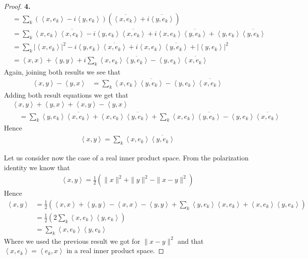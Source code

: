 \documentclass[11pt]{article}
\newcommand{\inprd}[1]{\left\langle{#1}\right\rangle}
\theoremstyle{definition}
\begin{document}
\begin{proof}{\textbf{4.}}
\begin{align*}
    &= \sum_{k} (\inprd{x, e_k}-i\inprd{y, e_k})(\overline{\inprd{x, e_k}}
    + i\overline{\inprd{y,e_k}})\\
    &= \sum_{k} \inprd{x, e_k}\overline{\inprd{x, e_k}}
    - i\inprd{y, e_k}\overline{\inprd{x, e_k}}
    + i\inprd{x, e_k}\overline{\inprd{y,e_k}} 
    + \inprd{y, e_k}\overline{\inprd{y,e_k}}\\
    &= \sum_{k} |\inprd{x, e_k}|^2
    - i\inprd{y, e_k}\overline{\inprd{x, e_k}}
    + i\inprd{x, e_k}\overline{\inprd{y,e_k}} 
    + |\inprd{y, e_k}|^2\\
    &= \inprd{x,x} + \inprd{y,y} + i\sum_{k}
    \inprd{x, e_k}\overline{\inprd{y,e_k}}
    -\inprd{y, e_k}\overline{\inprd{x, e_k}}
\end{align*}
Again, joining both results we see that
\begin{align*}
    \inprd{x, y} - \inprd{y, x} &= \sum_{k}
    \inprd{x, e_k}\overline{\inprd{y,e_k}}
    -\inprd{y, e_k}\overline{\inprd{x, e_k}}
\end{align*}
Adding both result equations we get that
\begin{align*}
    &\inprd{x,y} + \inprd{y, x}
    + \inprd{x, y} - \inprd{y, x}\\
    &\quad= \sum_{k}
    \inprd{y, e_k}\overline{\inprd{x, e_k}}
    + \inprd{x, e_k}\overline{\inprd{y,e_k}}
    + \sum_{k}
    \inprd{x, e_k}\overline{\inprd{y,e_k}}
    -\inprd{y, e_k}\overline{\inprd{x, e_k}}
\end{align*}
Hence
\begin{align*}
    \inprd{x,y} = \sum_{k} \inprd{x, e_k}\overline{\inprd{y,e_k}}
\end{align*}

Let us consider now the case of a real inner product space.
From the polarization identity we know that
\begin{align*}
    \inprd{x,y} = \frac{1}{2}(\|x\|^2 + \|y\|^2 - \|x-y\|^2)
\end{align*}
Hence
\begin{align*}
    \inprd{x,y} &= \frac{1}{2}(
    \inprd{x,x} + \inprd{y,y} - \inprd{x,x} - \inprd{y,y}
    + \sum_{k}
    \inprd{y, e_k}\inprd{x, e_k}
    + \inprd{x, e_k}\inprd{y,e_k})\\
    &= \frac{1}{2}(
    2\sum_{k}\inprd{x, e_k}\inprd{y,e_k})\\
    &= \sum_{k} \inprd{x, e_k}\inprd{y,e_k}
\end{align*}
Where we used the previous result we got for $\|x-y\|^2$ and that
$\inprd{x, e_k} = \inprd{e_k, x}$ in a real inner product space.
\end{proof}
\end{document}
